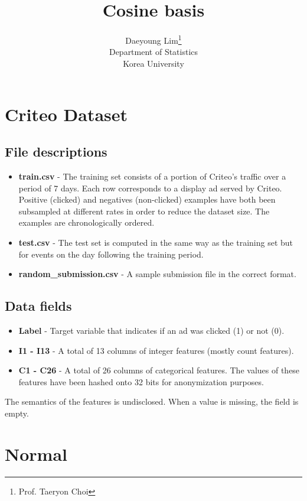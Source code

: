 \documentclass[11pt]{article}
\begin{document}
\nocite{*}

\title{Cosine basis}

\author{Daeyoung Lim\thanks{Prof. Taeryon Choi} \\
Department of Statistics \\
Korea University}

\maketitle
\section{Criteo Dataset}
\subsection{File descriptions}
\begin{itemize}
  \item \textbf{train.csv} - The training set consists of a portion of Criteo's traffic over a period of 7 days. Each row corresponds to a display ad served by Criteo. Positive (clicked) and negatives (non-clicked) examples have both been subsampled at different rates in order to reduce the dataset size. The examples are chronologically ordered.
  \item \textbf{test.csv} - The test set is computed in the same way as the training set but for events on the day following the training period.
  \item \textbf{random\_submission.csv} - A sample submission file in the correct format.
\end{itemize}
\subsection{Data fields}
\begin{itemize}
  \item \textbf{Label} - Target variable that indicates if an ad was clicked (1) or not (0).
  \item \textbf{I1 - I13} - A total of 13 columns of integer features (mostly count features).
  \item \textbf{C1 - C26} - A total of 26 columns of categorical features. The values of these features have been hashed onto 32 bits for anonymization purposes.
\end{itemize}

The semantics of the features is undisclosed. When a value is missing, the field is empty.
\section{Normal}
\end{document}
